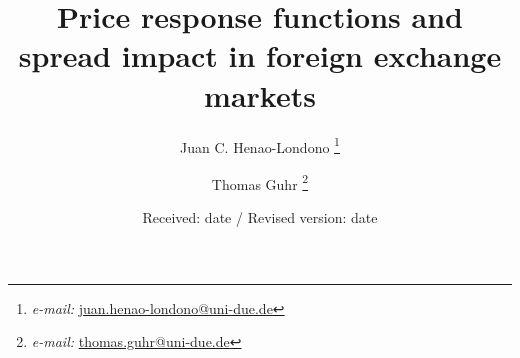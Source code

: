 \title{Price response functions and spread impact in foreign exchange markets}
\author{Juan C. Henao-Londono
        \thanks{\emph{e-mail: }\href{mailto:juan.henao-londono@uni-due.de}
        {juan.henao-londono@uni-due.de}}
        \and Thomas Guhr
        \thanks{\emph{e-mail: }\href{mailto:thomas.guhr@uni-due.de}
        {thomas.guhr@uni-due.de}}}
\date{Received: date / Revised version: date}
